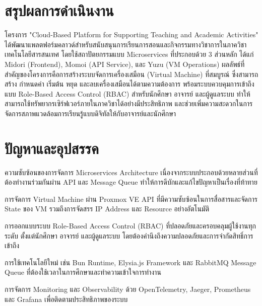 
\section{สรุปผลการดำเนินงาน}
\hspace*{1.5em}
โครงการ "Cloud-Based Platform for Supporting Teaching and Academic Activities" ได้พัฒนาแพลตฟอร์มคลาวด์สำหรับสนับสนุนการเรียนการสอนและกิจกรรมทางวิชาการในภาควิชาเทคโนโลยีสารสนเทศ โดยใช้สถาปัตยกรรมแบบ Microservices ที่ประกอบด้วย 3 ส่วนหลัก ได้แก่ Midori (Frontend), Momoi (API Service), และ Yuzu (VM Operations) ผลลัพธ์ที่สำคัญของโครงการคือการสร้างระบบจัดการเครื่องเสมือน (Virtual Machine) ที่สมบูรณ์ ซึ่งสามารถสร้าง กำหนดค่า เริ่มต้น หยุด และลบเครื่องเสมือนได้ตามความต้องการ พร้อมระบบควบคุมการเข้าถึงแบบ Role-Based Access Control (RBAC) สำหรับนักศึกษา อาจารย์ และผู้ดูแลระบบ ทำให้สามารถใช้ทรัพยากรเซิร์ฟเวอร์ภายในภาควิชาได้อย่างมีประสิทธิภาพ และช่วยเพิ่มความสะดวกในการจัดการสภาพแวดล้อมการเรียนรู้แบบดิจิทัลให้กับอาจารย์และนักศึกษา

\section{ปัญหาและอุปสรรค}
\begin{mycustomenum}[label=5.2.\arabic*] 
    \item ความซับซ้อนของการจัดการ Microservices Architecture เนื่องจากระบบประกอบด้วยหลายส่วนที่ต้องทำงานร่วมกันผ่าน API และ Message Queue ทำให้การดีบักและแก้ไขปัญหาเป็นเรื่องที่ท้าทาย
    \item การจัดการ Virtual Machine ผ่าน Proxmox VE API ที่มีความซับซ้อนในการสื่อสารและจัดการ State ของ VM รวมถึงการจัดสรร IP Address และ Resource อย่างอัตโนมัติ
    \item การออกแบบระบบ Role-Based Access Control (RBAC) ที่ปลอดภัยและครอบคลุมผู้ใช้งานทุกระดับ ตั้งแต่นักศึกษา อาจารย์ และผู้ดูแลระบบ โดยต้องคำนึงถึงความปลอดภัยและการจำกัดสิทธิ์การเข้าถึง
    \item การใช้เทคโนโลยีใหม่ เช่น Bun Runtime, Elysia.js Framework และ RabbitMQ Message Queue ที่ต้องใช้เวลาในการศึกษาและทำความเข้าใจการทำงาน
    \item การจัดการ Monitoring และ Observability ด้วย OpenTelemetry, Jaeger, Prometheus และ Grafana เพื่อติดตามประสิทธิภาพของระบบ
\end{mycustomenum}

